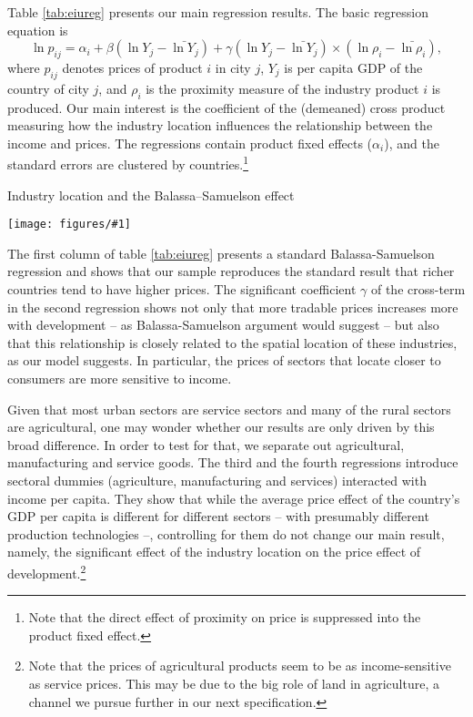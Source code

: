 \documentclass[12pt]{article}
\newcommand{\dotable}[2]{\begin{table}[h!]
\begin{centering}
\caption{#2\label{tab:#1}}
\texttt{[image: figures/\#1]}  
\end{centering}
\end{table}}
\begin{document}
Table \ref{tab:eiureg} presents our main regression results. The basic regression equation is
\begin{equation*}
\ln p_{ij}=\alpha_i+\beta(\ln Y_{j}-\bar{\ln Y_j})+\gamma(\ln Y_j-\bar{\ln Y_j})\times(\ln\rho_i-\bar{\ln\rho_i}),
\end{equation*}
where $p_{ij}$ denotes prices of product $i$ in city $j$, $Y_j$ is per capita GDP of the country of city $j$, and $\rho_i$ is the proximity measure of the industry product $i$ is produced. Our main interest is the coefficient of the (demeaned) cross product measuring how the industry location influences the relationship between the income and prices. The regressions contain product fixed effects ($\alpha_i$), and the standard errors are clustered by countries.\footnote{Note that the direct effect of proximity on price is suppressed into the product fixed effect.}

\dotable{eiureg}{Industry location and the Balassa--Samuelson effect}

The first column of table \ref{tab:eiureg} presents a standard Balassa-Samuelson regression and shows that our sample reproduces the standard result that richer countries tend to have higher prices. The significant coefficient $\gamma$ of the cross-term in the second regression shows not only that more tradable prices increases more with development -- as Balassa-Samuelson argument would suggest -- but also that this relationship is closely related to the spatial location of these industries, as our model suggests. In particular, the prices of sectors that locate closer to consumers are more sensitive to income.

Given that most urban sectors are service sectors and many of the rural sectors are agricultural, one may wonder whether our results are only driven by this broad difference. In order to test for that, we separate out agricultural, manufacturing and service goods. The third and the fourth regressions introduce sectoral dummies (agriculture, manufacturing and services) interacted with income per capita. They show that while the average price effect of the country's GDP per capita is different for different sectors -- with presumably different production technologies --, controlling for them do not change our main result, namely, the significant effect of the industry location on the price effect of development.\footnote{Note that the prices of agricultural products seem to be as income-sensitive as service prices. This may be due to the big role of land in agriculture, a channel we pursue further in our next specification.}
\end{document}
